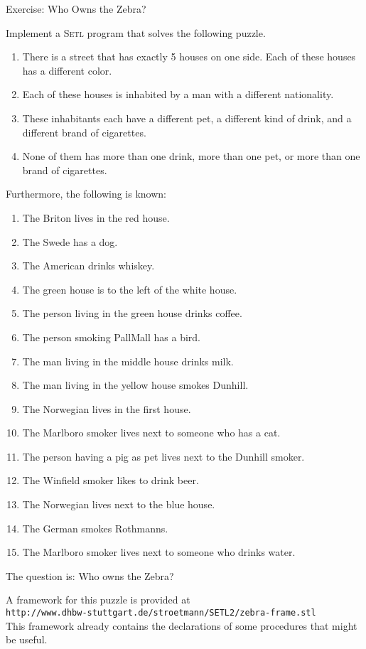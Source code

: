 \documentclass{article}
\begin{document}
\noindent
{\Large Exercise: Who Owns the Zebra?}
\vspace{0.5cm}

\noindent
Implement a \textsc{Setl} program that solves the following puzzle.
\begin{enumerate}
\item There is a street that has exactly 5 houses on one side.
      Each of these houses has a different color.
\item Each of these houses is inhabited by a man with a different nationality.
\item These inhabitants each have a different pet, a different kind of drink, and a 
      different brand of cigarettes.
\item None of them has more than one drink, more than one pet, or more than one 
      brand of cigarettes.
\end{enumerate}
Furthermore, the following is known:
\begin{enumerate}
\item The Briton lives in the red house.
\item The Swede has a dog.
\item The American drinks whiskey. 
\item The green house is to the left of the white house.
\item The person living in the green house drinks coffee.
\item The person smoking  PallMall has a bird.
\item The man living in the middle house drinks milk.
\item The man living in the yellow house smokes Dunhill.
\item The Norwegian lives in the first house.
\item The Marlboro smoker lives next to someone who has a cat.
\item The person having a pig as pet lives next to the Dunhill smoker.
\item The Winfield smoker likes to drink beer.
\item The Norwegian lives next to the blue house.
\item The German smokes Rothmanns.
\item The Marlboro smoker lives next to someone who drinks water.
\end{enumerate}
The question is: Who owns the Zebra?
\vspace{0.5cm}

\noindent 
A framework for this puzzle is provided at
\\[0.2cm]
\hspace*{1.3cm}
\texttt{http://www.dhbw-stuttgart.de/stroetmann/SETL2/zebra-frame.stl}
\\[0.2cm]
This framework already contains the declarations of some procedures that might 
be useful.
\end{document}
